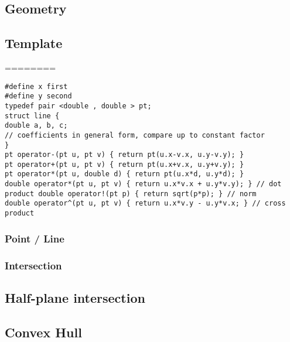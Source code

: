 \documentclass[10pt,oneside]{article}
\begin{document}
\begin{landscape}
\begin{multicols}{2}
\section{Geometry}

\subsection{Template}



========\\

\begin{lstlisting}
#define x first
#define y second
typedef pair <double , double > pt;
struct line {
double a, b, c;
// coefficients in general form, compare up to constant factor
}
pt operator-(pt u, pt v) { return pt(u.x-v.x, u.y-v.y); }
pt operator+(pt u, pt v) { return pt(u.x+v.x, u.y+v.y); }
pt operator*(pt u, double d) { return pt(u.x*d, u.y*d); }
double operator*(pt u, pt v) { return u.x*v.x + u.y*v.y); } // dot product double operator!(pt p) { return sqrt(p*p); } // norm
double operator^(pt u, pt v) { return u.x*v.y - u.y*v.x; } // cross product
\end{lstlisting}

\subsubsection{Point / Line}

\subsubsection{Intersection}

\subsection{Half-plane intersection}

\subsection{Convex Hull}

\end{multicols}
\end{landscape}
\end{document}
